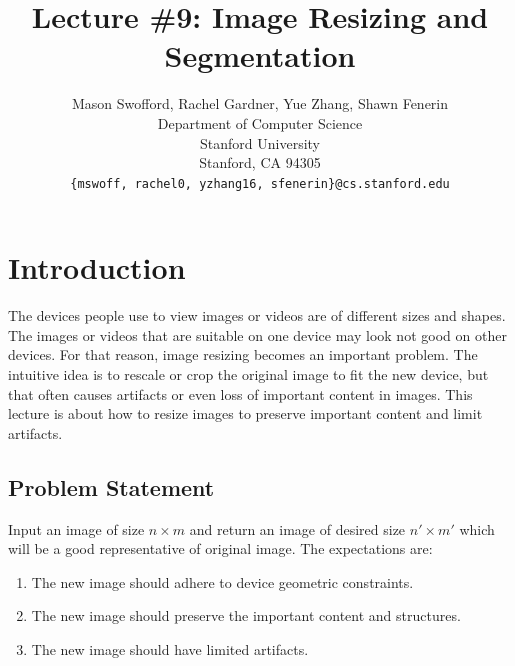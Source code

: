 \documentclass{article}
\title{Lecture \#9: Image Resizing and Segmentation}
\author{
  Mason Swofford, Rachel Gardner, Yue Zhang, Shawn Fenerin \\
  Department of Computer Science\\
  Stanford University\\
  Stanford, CA 94305 \\
  \texttt{\{mswoff, rachel0, yzhang16, sfenerin\}@cs.stanford.edu} \\
}
\begin{document}
\maketitle

\section{Introduction}
The devices people use to view images or videos are of different sizes and shapes. The images or videos that are suitable on one device may look not good on other devices. For that reason, image resizing becomes an important problem. The intuitive idea is to rescale or crop the original image to fit the new device, but that often causes artifacts or even loss of important content in images. This lecture is about how to resize images to preserve important content and limit artifacts.

\subsection{Problem Statement}
Input an image of size $n\times m$ and return an image of desired size $n'\times m'$ which will be a good representative of original image. The expectations are:
\begin{enumerate}
\item The new image should adhere to device geometric constraints.
\item The new image should preserve the important content and structures.
\item The new image should have limited artifacts.
\end{enumerate}
\end{document}
